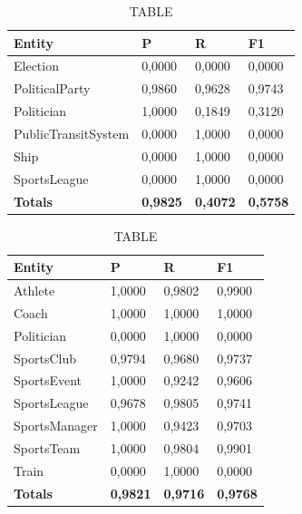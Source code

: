 \documentclass[thesis=M,english]{FITthesis}[2018/05/30]
\begin{document}
	\begin{table}[H]\centering
		\caption{TABLE}
		\label{}
		\begin{tabular}{|l|l|l|l|}
			\hline {\textbf{Entity}} & {\textbf{P}} & {\textbf{R}} & {\textbf{F1}}\\\hline
				Election & 0,0000 & 0,0000 & 0,0000\\
				PoliticalParty & 0,9860 & 0,9628 & 0,9743\\
				Politician & 1,0000 & 0,1849 & 0,3120\\
				PublicTransitSystem & 0,0000 & 1,0000 & 0,0000\\
				Ship & 0,0000 & 1,0000 & 0,0000\\
				SportsLeague & 0,0000 & 1,0000 & 0,0000\\\hline
				\textbf{Totals} & \textbf{0,9825} & \textbf{0,4072} & \textbf{0,5758}\\\hline
		\end{tabular}
	\end{table}	

	\begin{table}[H]\centering
		\caption{TABLE}
		\label{}
		\begin{tabular}{|l|l|l|l|}
			\hline {\textbf{Entity}} & {\textbf{P}} & {\textbf{R}} & {\textbf{F1}}\\\hline
				Athlete & 1,0000 & 0,9802 & 0,9900\\
				Coach & 1,0000 & 1,0000 & 1,0000\\
				Politician & 0,0000 & 1,0000 & 0,0000\\
				SportsClub & 0,9794 & 0,9680 & 0,9737\\
				SportsEvent & 1,0000 & 0,9242 & 0,9606\\
				SportsLeague & 0,9678 & 0,9805 & 0,9741\\
				SportsManager & 1,0000 & 0,9423 & 0,9703\\				
				SportsTeam & 1,0000 & 0,9804 & 0,9901\\
				Train & 0,0000 & 1,0000 & 0,0000\\\hline
				\textbf{Totals} & \textbf{0,9821} & \textbf{0,9716} & \textbf{0,9768}\\\hline
		\end{tabular}
	\end{table}	
\end{document}
